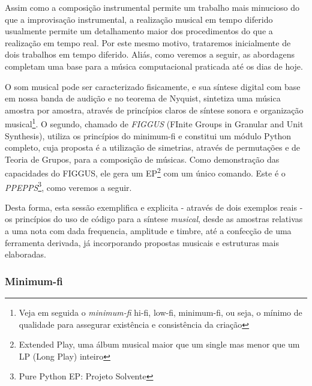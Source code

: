 Assim como a composição instrumental permite um trabalho mais
minucioso do que a improvisação instrumental, a realização musical em
tempo diferido usualmente permite um detalhamento maior dos
procedimentos do que a realização em tempo real. Por este mesmo
motivo, trataremos inicialmente de dois trabalhos em tempo diferido.
Aliás, como veremos a seguir, as abordagens completam uma base para a
música computacional praticada até os dias de hoje.

O som musical pode ser caracterizado fisicamente, e sua síntese
digital com base em nossa banda de audição e no teorema de Nyquist,
sintetiza uma música amostra por amostra, através de princípios claros
de síntese sonora e organização musical\footnote{Veja em seguida o
  \emph{minimum-fi} hi-fi, low-fi, minimum-fi, ou seja, o mínimo de
  qualidade para assegurar existência e consistência da criação}. O
segundo, chamado de \emph{FIGGUS} (FInite Groups in Granular and Unit
Synthesis), utiliza os princípios do minimum-fi e constitui um módulo
Python completo, cuja proposta é a utilização de simetrias, através de
permutações e de Teoria de Grupos, para a composição de músicas. Como
demonstração das capacidades do FIGGUS, ele gera um
EP\footnote{Extended Play, uma álbum musical maior que um single mas
  menor que um LP (Long Play) inteiro} com um único comando. Este é o
\emph{PPEPPS}\footnote{Pure Python EP: Projeto Solvente}, como veremos
a seguir.

Desta forma, esta sessão exemplifica e explicita - através de dois
exemplos reais - os princípios do uso de código para a síntese
\emph{musical}, desde as amostras relativas a uma nota com dada
frequencia, amplitude e timbre, até a confecção de uma ferramenta
derivada, já incorporando propostas musicais e estruturas mais
elaboradas.

\subsubsection{Minimum-fi}

